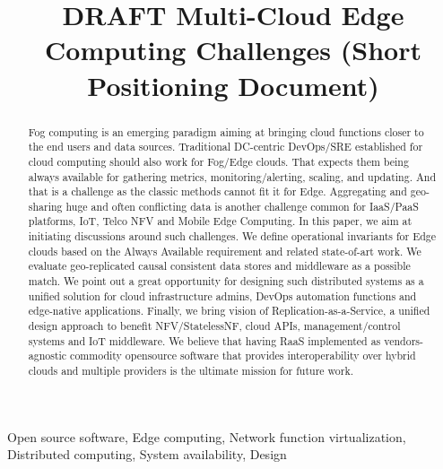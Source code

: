 \documentclass[conference]{IEEEtran}
\begin{document}
\title{DRAFT Multi-Cloud Edge Computing Challenges (Short Positioning Document)\\
}

\author{
\IEEEauthorblockA{\textit{} \\
\textit{}\\
\\
}
}

\maketitle

\begin{abstract}
Fog computing is an emerging paradigm aiming at bringing cloud functions closer
to the end users and data sources. Traditional DC-centric DevOps/SRE
established for cloud computing should also work for Fog/Edge clouds. That
expects them being always available for gathering metrics, monitoring/alerting,
scaling, and updating. And that is a challenge as the classic methods cannot
fit it for Edge. Aggregating and geo-sharing huge and often conflicting data is
another challenge common for IaaS/PaaS platforms, IoT, Telco NFV and Mobile
Edge Computing. In this paper, we aim at initiating discussions around such
challenges. We define operational invariants for Edge clouds based on the
Always Available requirement and related state-of-art work. We evaluate
geo-replicated causal consistent data stores and middleware as a possible
match. We point out a great opportunity for designing such distributed systems
as a unified solution for cloud infrastructure admins, DevOps automation
functions and edge-native applications. Finally, we bring vision of
Replication-as-a-Service, a unified design approach to benefit NFV/StatelessNF,
cloud APIs, management/control systems and IoT middleware. We believe that
having RaaS implemented as vendors-agnostic commodity opensource software that
provides interoperability over hybrid clouds and multiple providers is the
ultimate mission for future work.
\end{abstract}

\begin{IEEEkeywords}
Open source software, Edge computing, Network function virtualization,
Distributed computing, System availability, Design
\end{IEEEkeywords}
\end{document}
